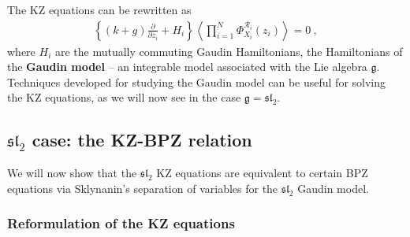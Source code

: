 \documentclass[12pt, a4paper, notitlepage, twoside]{report}
\numberwithin{equation}{section}
\theoremstyle{break}
\begin{document}
The KZ equations can be rewritten as 
\begin{align}
 \left\{(k+g){\frac{\partial}{\partial z_i}} + H_i \right\}\left\langle \prod_{i=1}^N \Phi^{\mathcal{R}_i}_{X_i}(z_i)\right\rangle   = 0 \ ,
\label{phz}
\end{align}
where $H_i$ are the mutually commuting Gaudin Hamiltonians, the Hamiltonians of the \textbf{\boldmath Gaudin model} -- an integrable model associated with the Lie algebra $\mathfrak{g}$.
Techniques developed for studying the Gaudin model can be useful for solving the KZ equations, as we will now see in the case $\mathfrak{g} = \mathfrak{sl}_2$. 


\subsection{\texorpdfstring{$\mathfrak{sl}_2$}{sl2} case: the KZ-BPZ relation} \label{seckzbpz}

We will now show that the $\mathfrak{sl}_2$ KZ equations are equivalent to certain BPZ equations via Sklynanin's separation of variables for the $\mathfrak{sl}_2$ Gaudin model. 

\subsubsection{Reformulation of the KZ equations}
\end{document}
